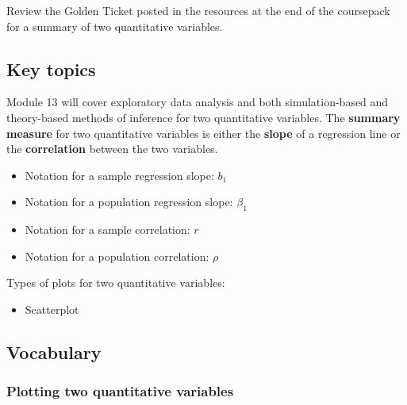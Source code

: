 \documentclass[
]{report}
\providecommand{\tightlist}{%
  \setlength{\itemsep}{0pt}\setlength{\parskip}{0pt}}
\begin{document}
Review the Golden Ticket posted in the resources at the end of the coursepack for a summary of two quantitative variables.

\subsection{Key topics}\label{key-topics-12}

Module 13 will cover exploratory data analysis and both simulation-based and theory-based methods of inference for two quantitative variables. The \textbf{summary measure} for two quantitative variables is either the \textbf{slope} of a regression line or the \textbf{correlation} between the two variables.

\begin{itemize}
\item
  Notation for a sample regression slope: \(b_1\)
\item
  Notation for a population regression slope: \(\beta_1\)
\item
  Notation for a sample correlation: \(r\)
\item
  Notation for a population correlation: \(\rho\)
\end{itemize}

Types of plots for two quantitative variables:

\begin{itemize}
\tightlist
\item
  Scatterplot
\end{itemize}

\subsection{Vocabulary}\label{vocabulary-10}

\subsubsection*{Plotting two quantitative variables}\label{plotting-two-quantitative-variables}
\end{document}
